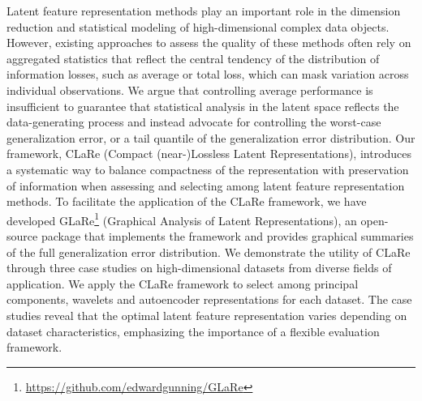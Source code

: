 Latent feature representation methods play an important role in the dimension reduction and statistical modeling of high-dimensional complex data objects.
However, existing approaches to assess the quality of these methods often rely on aggregated statistics that reflect the central tendency of the distribution of information losses, such as average or total loss, which can mask variation across individual observations.
We argue that controlling average performance is insufficient to guarantee that statistical analysis in the latent space reflects the data-generating process and instead advocate for controlling the worst-case generalization error, or a tail quantile of the generalization error distribution.
Our framework, CLaRe (Compact (near-)Lossless Latent Representations), introduces a systematic way to balance compactness of the representation with preservation of information when assessing and selecting among latent feature representation methods. 
To facilitate the application of the CLaRe framework, we have developed GLaRe\footnote{\url{https://github.com/edwardgunning/GLaRe}} (Graphical Analysis of Latent Representations), an open-source  package that implements the framework and provides graphical summaries of the full generalization error distribution.
We demonstrate the utility of CLaRe through three case studies on high-dimensional datasets from diverse fields of application.
We apply the CLaRe framework to select among principal components, wavelets and autoencoder representations for each dataset.
The case studies reveal that the optimal latent feature representation varies depending on dataset characteristics, emphasizing the importance of a flexible evaluation framework.